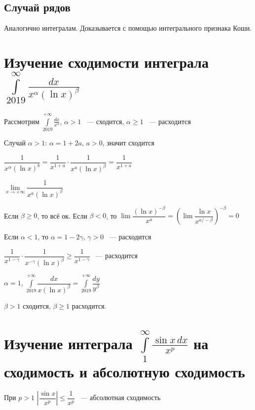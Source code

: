 \documentclass{article}
\begin{document}
        \subsection{Случай рядов}
            
            Аналогично интегралам. Доказывается с помощью интегрального признака Коши.
            
    \newpage
    
    \section{Изучение сходимости интеграла $\int\limits_{2019}^{\infty}\frac{dx}{x^{\alpha}(\ln x)^{\beta}}$}
    
        Рассмотрим $\int\limits^{+\infty}_2019 \frac{dx}{x^{\alpha}}$, $\alpha > 1$ ~--- сходится, $\alpha \geq 1$ ~--- расходится
        
        Случай $\alpha > 1$: $\alpha = 1 + 2a$, $a > 0$, значит сходится
        
        $\dfrac{1}{x^{\alpha} (\ln {x})^b} = \dfrac{1}{x^{1 + a}} \cdot \dfrac{1}{x^a(\ln{x})^{\beta}} = \dfrac{1}{x^{1 + a}}$
        
        $\lim\limits_{x \rightarrow +\infty} \dfrac{1}{x^a (\ln{x})^{\beta}}$
        
        Если $\beta \geq 0$, то всё ок. Если $\beta < 0$, то $\lim \dfrac{(\ln{x})^{-\beta}}{x^a} = \left( \lim \dfrac{\ln{x}}{x^{a / -\beta}} \right)^{-\beta} = 0$
        
        Если $\alpha < 1$, то $\alpha = 1 - 2 \gamma$, $\gamma > 0$ ~--- расходится
        
        $\dfrac{1}{x^{1 - \gamma}} \cdot \dfrac{1}{x^{-\gamma}(\ln{x})^{\beta}} \geq \dfrac{1}{x^{1 - \gamma}}$ ~--- расходится
        
        $\alpha = 1$, $\int\limits^{+\infty}_2019 \dfrac{dx}{x(\ln{x})^{\beta}} = \int\limits^{+\infty}_2019 \dfrac{dy}{y^{\beta}}$
        
        $\beta > 1$ сходится, $\beta \geq 1$ расходится.
        
    \newpage
    
    \section{Изучение интеграла $\int\limits_1^{\infty} \frac{\sin x\,dx}{x^p}$ на сходимость и абсолютную сходимость}
    
        При $p > 1$ $\left| \dfrac{\sin{x}}{x^p} \right| \leq \dfrac{1}{x^p}$ ~--- абсолютная сходимость
        
\end{document}
